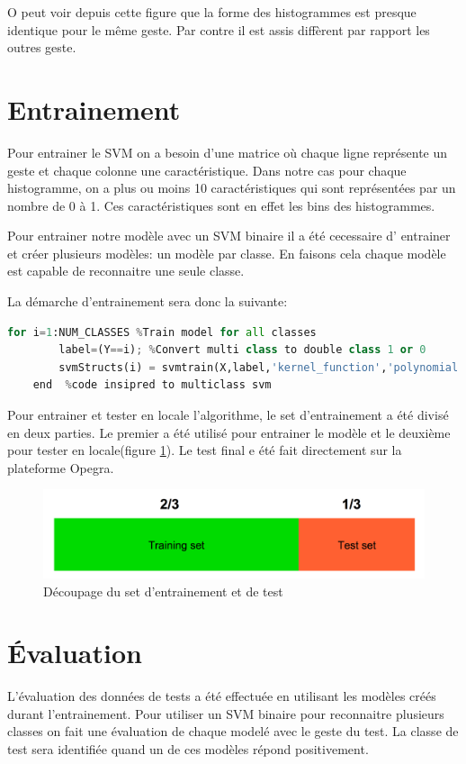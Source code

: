 O peut voir depuis cette figure que la forme des histogrammes est presque identique pour le même geste. Par contre il est assis diffèrent par rapport les outres geste.

\section*{Entrainement}

Pour entrainer le SVM on a besoin d'une matrice où chaque ligne représente un geste et chaque colonne une caractéristique. Dans notre cas pour chaque histogramme, on a plus ou moins 10 caractéristiques qui sont représentées par un nombre de 0 à 1.  Ces caractéristiques sont en effet les bins des histogrammes.

Pour entrainer notre modèle avec un SVM binaire il a été cecessaire d’ entrainer et créer plusieurs modèles: un modèle par classe. En faisons cela chaque modèle est capable de reconnaitre une seule classe.

La démarche d'entrainement sera donc la suivante:
\begin{lstlisting}[language=python]
    for i=1:NUM_CLASSES %Train model for all classes
        label=(Y==i); %Convert multi class to double class 1 or 0
        svmStructs(i) = svmtrain(X,label,'kernel_function','polynomial');
    end  %code insipred to multiclass svm
\end{lstlisting}


Pour entrainer et tester en locale l'algorithme, le set d'entrainement a été divisé en deux parties. Le premier a été utilisé pour entrainer le modèle et le deuxième pour tester en locale(figure \ref{fig:trainset}). Le test final e été fait directement sur la plateforme Opegra.

\begin{figure}[h]
  \centering
    \includegraphics[width=1\linewidth]{img/evaluation/trainset.png}
  \caption{Découpage du set d'entrainement et de test}
  \label{fig:trainset}
\end{figure}



\section*{Évaluation}
L'évaluation des données de tests a été effectuée en utilisant les modèles créés durant l'entrainement. Pour utiliser un SVM binaire pour reconnaitre plusieurs classes on fait une évaluation de chaque modelé avec le geste du test. La classe de test sera identifiée quand un de ces modèles répond positivement.

